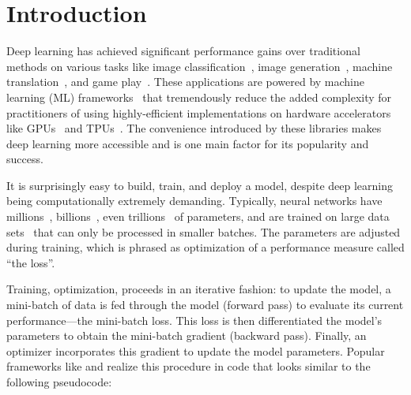 \section{Introduction}\label{sec:introduction}

Deep learning has achieved significant performance gains over traditional
methods on various tasks like image
classification~\cite{deng2009imagenet,krizhevsky2012imagenet,zeiler2012visualizing,simonyan2015deep,szegedy2015going,he2016deep},
image
generation~\cite{goodfellow2014generative,choi2020starganv2,karras2018progressive,ramesh2021zero},
machine translation~\cite{bahdanau2014neural,luong2015effective,wu2016google},
and game play~\cite{mnih2013playing,silver2016mastering,silver2018general}.
These applications are powered by machine learning (ML)
frameworks~\cite{tokui2015chainer,chen2015mxnet,paszke2019pytorch,abadi2016tensorflow,}
that tremendously reduce the added complexity for practitioners of using
highly-efficient implementations on hardware accelerators like
GPUs~\cite{kirk2007nvidia} and TPUs~\cite{jouppi2017in}. The convenience
introduced by these libraries makes deep learning more accessible and is one
main factor for its popularity and success.

It is surprisingly easy to build, train, and deploy a model, despite deep
learning being computationally extremely demanding. Typically, neural networks
have
millions~\cite{krizhevsky2012imagenet,zeiler2012visualizing,simonyan2015deep,szegedy2015going,he2016deep},
billions~\cite{radford2019language,brown2020language}, even
trillions~\cite{fedus2022switch} of parameters, and are trained on large data
sets~\cite{deng2009imagenet,lin2014microsoft} that can only be processed in
smaller batches. The parameters are adjusted during training, which is phrased
as optimization of a performance measure called ``the loss''.

Training, \ie optimization, proceeds in an iterative fashion: to update the
model, a mini-batch of data is fed through the model (forward pass) to evaluate
its current performance---the mini-batch loss. This loss is then differentiated
\wrt the model's parameters to obtain the mini-batch gradient (backward pass).
Finally, an optimizer incorporates this gradient to update the model parameters.
Popular frameworks like \pytorch \cite{paszke2019pytorch} and \tensorflow
\cite{abadi2016tensorflow} realize this procedure in code that looks similar to
the following pseudocode:

